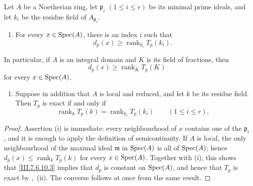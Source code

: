 \begin{corollary}[7.6.10]
\label{III.7.6.10}
Let $A$ be a Noetherian ring, let
$\mathfrak p_i$ $(1\leq i\leq r)$ be its minimal prime
ideals, and let $k_i$ be the residue field of
$A_{\mathfrak p_i}$.
\begin{enumerate}
  \item[\textup{(i)}] For every $x\in\operatorname{Spec}(A)$, there is an index $i$
    such that
    \[
      d_p(x)\geq
      \operatorname{rank}_{k_i}T_p(k_i).
      \tag{7.6.10.1}\label{III.7.6.10.1}
    \]
\end{enumerate}
In particular, if $A$ is an integral domain and $K$ is its
field of fractions, then
\[
  d_p(x)\geq\operatorname{rank}_K T_p(K)
  \tag{7.6.10.2}\label{III.7.6.10.2}
\]
for every $x\in\operatorname{Spec}(A)$.

\begin{enumerate}
  \item[\textup{(ii)}] Suppose in addition that $A$ is local and
    reduced, and let $k$ be its residue field.  Then $T_p$ is
    exact if and only if
    \[
      \operatorname{rank}_k T_p(k)
      =
      \operatorname{rank}_{k_i}T_p(k_i)
      \qquad(1\leq i\leq r).
      \tag{7.6.10.3}\label{III.7.6.10.3}
    \]
\end{enumerate}
\end{corollary}

\begin{proof}
Assertion \textnormal{(i)} is immediate: every neighbourhood
of $x$ contains one of the $\mathfrak p_i$, and it is enough
to apply the definition of semicontinuity.  If $A$ is local,
the only neighbourhood of the maximal ideal $\mathfrak m$ in
$\operatorname{Spec}(A)$ is all of $\operatorname{Spec}(A)$; hence $d_p(x)\leq\operatorname{rank}_k T_p(k)$
for every $x\in\operatorname{Spec}(A)$.  Together with \textnormal{(i)},
this shows that \eqref{III.7.6.10.3} implies that $d_p$ is
constant on $\operatorname{Spec}(A)$, and hence that $T_p$ is exact by
,~(ii).  The converse follows at once from
the same result.
\end{proof}

\egaIIISubsectionSevenSixEleven
